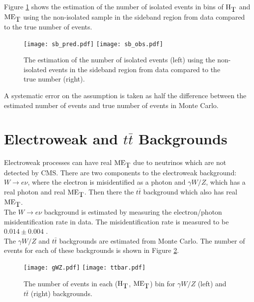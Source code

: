 Figure \ref{fig:Bkgd_Est_Sideband} shows the estimation of the number of
isolated events in bins of $\mbox{H}_{\mbox{T}}$ and $\mbox{ME}_{\mbox{T}}$ using the non-isolated sample in the
sideband region from data compared to the true number of events. \\

\begin{figure}
\texttt{[image: sb\_pred.pdf]}
\texttt{[image: sb\_obs.pdf]}
\caption{The estimation of the number of isolated events (left) using the
non-isolated events in the sideband region from data compared to the true number
(right).}
\label{fig:Bkgd_Est_Sideband}
\end{figure}

A systematic error on the assumption is taken as half the difference between the
estimated number of events and true number of events in Monte Carlo.

\section{Electroweak and $t\bar{t}$ Backgrounds}

Electroweak processes can have real $\mbox{ME}_{\mbox{T}}$ due to neutrinos which are not
detected by CMS. There are two components to the electroweak background:
$W\rightarrow e\nu$, where the electron is misidentified as a photon and 
$\gamma W/Z$, which has a real photon and real $\mbox{ME}_{\mbox{T}}$. Then there the $t\bar{t}$
background which also has real $\mbox{ME}_{\mbox{T}}$. \\

The $W\rightarrow e\nu$ background is estimated by measuring the electron/photon
misidentification rate in data. The misidentification rate is measured to be
$0.014\pm0.004$ \cite{ra3}. \\

The $\gamma W/Z$ and $t\bar{t}$ backgrounds are estimated from Monte Carlo. The
number of events for each of these backgrounds is shown in Figure
\ref{fig:wz_and_ttbar}.

\begin{figure}
\begin{center}
\texttt{[image: gWZ.pdf]}
\texttt{[image: ttbar.pdf]}
\end{center}
\caption{The number of events in each ($\mbox{H}_{\mbox{T}}$, $\mbox{ME}_{\mbox{T}}$) bin for $\gamma W/Z$
(left) and $t\bar{t}$ (right) backgrounds.}
\label{fig:wz_and_ttbar}
\end{figure}



